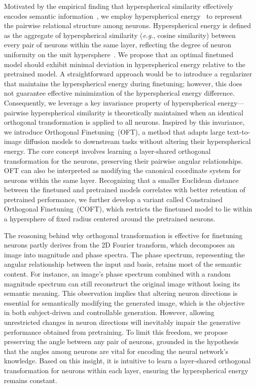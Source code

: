 Motivated by the empirical finding that hyperspherical similarity effectively encodes semantic information~\cite{liu2017deep,liu2018decoupled,chen2020angular}, we employ hyperspherical energy~\cite{liu2018learning} to represent the pairwise relational structure among neurons. Hyperspherical energy is defined as the aggregate of hyperspherical similarity (\emph{e.g.}, cosine similarity) between every pair of neurons within the same layer, reflecting the degree of neuron uniformity on the unit hypersphere~\cite{liu2021learning}. We propose that an optimal finetuned model should exhibit minimal deviation in hyperspherical energy relative to the pretrained model. A straightforward approach would be to introduce a regularizer that maintains the hyperspherical energy during finetuning; however, this does not guarantee effective minimization of the hyperspherical energy difference. Consequently, we leverage a key invariance property of hyperspherical energy—pairwise hyperspherical similarity is theoretically maintained when an identical orthogonal transformation is applied to all neurons. Inspired by this invariance, we introduce Orthogonal Finetuning~(OFT), a method that adapts large text-to-image diffusion models to downstream tasks without altering their hyperspherical energy. The core concept involves learning a layer-shared orthogonal transformation for the neurons, preserving their pairwise angular relationships. OFT can also be interpreted as modifying the canonical coordinate system for neurons within the same layer. Recognizing that a smaller Euclidean distance between the finetuned and pretrained models correlates with better retention of pretrained performance, we further develop a variant called Constrained Orthogonal Finetuning~(COFT), which restricts the finetuned model to lie within a hypersphere of fixed radius centered around the pretrained neurons.

The reasoning behind why orthogonal transformation is effective for finetuning neurons partly derives from the 2D Fourier transform, which decomposes an image into magnitude and phase spectra. The phase spectrum, representing the angular relationship between the input and basis, retains most of the semantic content. For instance, an image's phase spectrum combined with a random magnitude spectrum can still reconstruct the original image without losing its semantic meaning. This observation implies that altering neuron directions is essential for semantically modifying the generated image, which is the objective in both subject-driven and controllable generation. However, allowing unrestricted changes in neuron directions will inevitably impair the generative performance obtained from pretraining. To limit this freedom, we propose preserving the angle between any pair of neurons, grounded in the hypothesis that the angles among neurons are vital for encoding the neural network's knowledge. Based on this insight, it is intuitive to learn a layer-shared orthogonal transformation for neurons within each layer, ensuring the hyperspherical energy remains constant.

